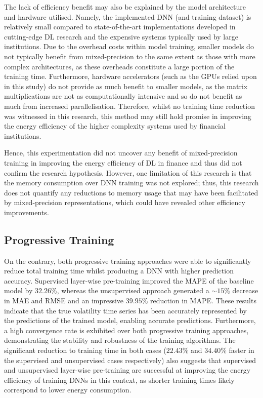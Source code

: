 \documentclass[a4paper, 11pt]{report}
\begin{document}
    The lack of efficiency benefit may also be explained by the model architecture and hardware utilised. Namely, the implemented DNN (and training dataset) is relatively small compared to state-of-the-art implementations developed in cutting-edge DL research and the expensive systems typically used by large institutions. Due to the overhead costs within model training, smaller models do not typically benefit from mixed-precision to the same extent as those with more complex architectures, as these overheads constitute a large portion of the training time. Furthermore, hardware accelerators (such as the GPUs relied upon in this study) do not provide as much benefit to smaller models, as the matrix multiplications are not as computationally intensive and so do not benefit as much from increased parallelisation. Therefore, whilst no training time reduction was witnessed in this research, this method may still hold promise in improving the energy efficiency of the higher complexity systems used by financial institutions. 

    Hence, this experimentation did not uncover any benefit of mixed-precision training in improving the energy efficiency of DL in finance and thus did not confirm the research hypothesis. However, one limitation of this research is that the memory consumption over DNN training was not explored; thus, this research does not quantify any reductions to memory usage that may have been facilitated by mixed-precision representations, which could have revealed other efficiency improvements.


    \subsection{Progressive Training}

    On the contrary, both progressive training approaches were able to significantly reduce total training time whilst producing a DNN with higher prediction accuracy. Supervised layer-wise pre-training improved the MAPE of the baseline model by $32.26\%$, whereas the unsupervised approach generated a $\sim \! 15\%$ decrease in MAE and RMSE and an impressive $39.95\%$ reduction in MAPE. These results indicate that the true volatility time series has been accurately represented by the predictions of the trained model, enabling accurate predictions. Furthermore, a high convergence rate is exhibited over both progressive training approaches, demonstrating the stability and robustness of the training algorithms. The significant reduction to training time in both cases ($22.43\%$ and $34.40\%$ faster in the supervised and unsupervised cases respectively) also suggests that supervised and unsupervised layer-wise pre-training are successful at improving the energy efficiency of training DNNs in this context, as shorter training times likely correspond to lower energy consumption.
\end{document}
